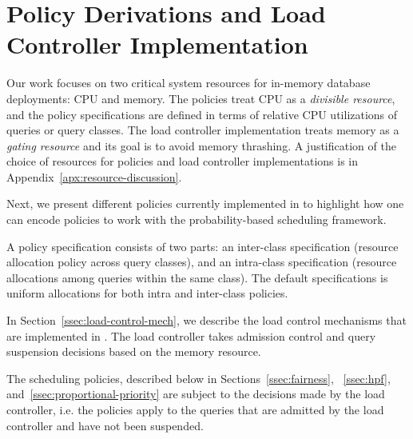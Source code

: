 \section{Policy Derivations and Load Controller Implementation}\label{sec:policy}
%
Our work focuses on two critical system resources for in-memory database deployments: CPU and memory. 
The policies treat CPU as a \textit{divisible resource}, and the policy specifications are defined in terms of relative CPU utilizations of queries or query classes.
The load controller implementation treats memory as a \textit{gating resource} and its goal is to avoid memory thrashing.
A justification of the choice of resources for policies and load controller implementations is in Appendix~\ref{apx:resource-discussion}.

Next, we present different policies currently implemented in \sys{} to highlight how one can encode policies to work with the probability-based scheduling framework. 

A policy specification consists of two parts: an inter-class specification (resource allocation policy across query classes), and an intra-class specification (resource allocations among queries within the same class). 
The default specifications is uniform allocations for both intra and inter-class policies. 

In Section~\ref{ssec:load-control-mech}, we describe the load control mechanisms that are implemented in \sys{}. 
The load controller takes admission control and query suspension decisions based on the memory resource.

The scheduling policies, described below in Sections~\ref{ssec:fairness}, ~\ref{ssec:hpf}, and~\ref{ssec:proportional-priority} are subject to the decisions made by the load controller, i.e. the policies apply to the queries that are admitted by the load controller and have not been suspended. %



